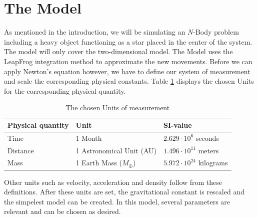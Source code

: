 \section{The Model}
As mentioned in the introduction, we will be simulating an \(N\)-Body problem including a heavy  object functioning as a star placed in the center of the system. The model will only cover the two-dimensional model.
The Model uses the LeapFrog integration method to approximate the new movements. 
Before we can apply Newton's equation however, we have to define our system of measurement and scale the corresponding physical constants.
Table \ref{tab:eenheden} displays the chosen Units for the corresponding physical quantity.

\begin{table}[h!]
\centering
\caption{The chosen Units of measurement}
\label{tab:eenheden}
\begin{tabular}{l|l|l}
  Physical quantity & Unit & SI-value \\ \hline
Time & 1 Month & \(2.629\cdot 10^{6}\) seconds  \\ 
 Distance & 1 Astronomical Unit (AU) & \(1.496\cdot10^{11}\) meters   \\
 Mass & 1 Earth Mass (\(M_\oplus\))& \(5.972\cdot10^{24}\) kilograms \\
\end{tabular}
\end{table}
Other units such as velocity, acceleration and density follow from these definitions. After these units are set, the gravitational constant is rescaled and the simpelest model can be created.
In this model, several parameters are relevant and can be chosen as desired. 
